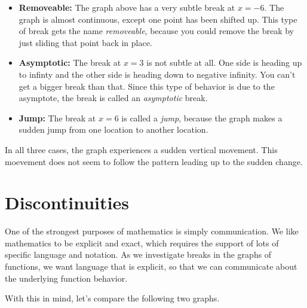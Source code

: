 \documentclass{ximera}
\begin{document}
\begin{itemize}
\item \textbf{\textcolor{blue!75!black}{Removeable:}}  The graph above has a very subtle break at $x=-6$. The graph is almost continuous, except one point has been shifted up. This type of break gets the name \textit{removeable}, because you could remove the break by just sliding that point back in place. \\

\item \textbf{\textcolor{blue!75!black}{Asymptotic:}} The break at $x=3$ is not subtle at all.  One side is heading up to infinty and the other side is heading down to negative infinity.  You can't get a bigger break than that. Since this type of behavior is due to the asymptote, the break is called an \textit{asymptotic} break. \\

\item \textbf{\textcolor{blue!75!black}{Jump:}} The break at $x=6$ is called a \textit{jump}, because the graph makes a sudden jump from one location to another location.
\end{itemize}


In all three cases, the graph experiences a sudden vertical movement.  This moevement does not seem to follow the pattern leading up to the sudden change.








\section{Discontinuities}
One of the strongest purposes of mathematics is simply communication.  We like mathematics to be explicit and exact, which requires the support of lots of specific language and notation. As we investigate breaks in the graphs of functions, we want language that is explicit, so that we can communicate about the underlying function behavior.

With this in mind, let's compare the following two graphs.
\end{document}
